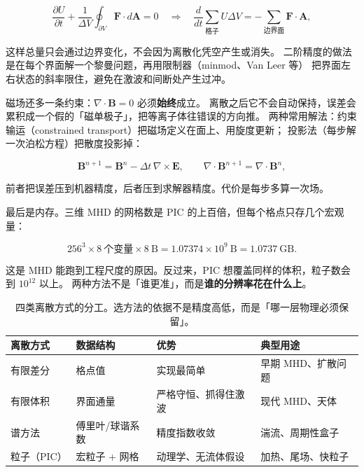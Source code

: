 \begin{equation}
\frac{\partial U}{\partial t}+\frac{1}{\Delta V}\oint_{\partial V}\mathbf{F}\cdot d\mathbf{A}=0
\quad\Longrightarrow\quad
\frac{d}{dt}\sum_{\text{格子}}U\Delta V
=-\sum_{\text{边界面}}\mathbf{F}\cdot\mathbf{A},
\label{eq:app-ac-flux}
\end{equation}

这样总量只会通过边界变化，不会因为离散化凭空产生或消失。
二阶精度的做法是在每个界面解一个黎曼问题，再用限制器（minmod、Van Leer 等）
把界面左右状态的斜率限住，避免在激波和间断处产生过冲。

磁场还多一条约束：$\nabla\cdot\mathbf{B}=0$ 必须\textbf{始终}成立。
离散之后它不会自动保持，误差会累积成一个假的「磁单极子」，把等离子体往错误的方向推。
两种常用解法：约束输运（constrained transport）把磁场定义在面上、用旋度更新；
投影法（每步解一次泊松方程）把散度投影掉：

\begin{equation}
\mathbf{B}^{n+1}=\mathbf{B}^n-\Delta t\,\nabla\times\mathbf{E},
\qquad
\nabla\cdot\mathbf{B}^{n+1}=\nabla\cdot\mathbf{B}^n,
\label{eq:app-ac-divb}
\end{equation}

前者把误差压到机器精度，后者压到求解器精度。代价是每步多算一次场。

最后是内存。三维 MHD 的网格数是 PIC 的上百倍，但每个格点只存几个宏观量：

\begin{equation}
256^3\times8\ \text{个变量}\times8\ \mathrm{B}=1.07374\times10^{9}\ \mathrm{B}=1.0737\ \mathrm{GB}.
\label{eq:app-ac-memory}
\end{equation}

这是 MHD 能跑到工程尺度的原因。反过来，PIC 想覆盖同样的体积，粒子数会到 $10^{12}$ 以上。
两种方法不是「谁更准」，而是\textbf{谁的分辨率花在什么上}。

\begin{table}[htbp]
\centering
\small
\caption{四类离散方式的分工。选方法的依据不是精度高低，而是「哪一层物理必须保留」。}
\label{tab:app-ac-discretization}
\begin{tabular}{p{2.6cm}p{3.0cm}p{3.2cm}p{4.0cm}}
\toprule
离散方式 & 数据结构 & 优势 & 典型用途 \\
\midrule
有限差分 & 格点值 & 实现最简单 & 早期 MHD、扩散问题 \\
有限体积 & 界面通量 & 严格守恒、抓得住激波 & 现代 MHD、天体 \\
谱方法 & 傅里叶/球谐系数 & 精度指数收敛 & 湍流、周期性盒子 \\
粒子（PIC） & 宏粒子 + 网格 & 动理学、无流体假设 & 加热、尾场、快粒子 \\
\bottomrule
\end{tabular}

\end{table}

